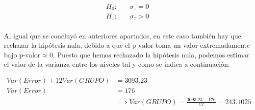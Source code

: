 \documentclass{article}
\begin{document}
      \begin{align*}
        H_0:&\quad \sigma_\tau = 0 \\
        H_1:&\quad \sigma_\tau > 0
      \end{align*}

      \paragraph{}
      Al igual que se concluyó en anteriores apartados, en este caso también hay que rechazar la hipótesis nula, debido a que el $\text{p-valor}$ toma un valor extremadamente bajo $\text{p-valor}\approx 0$. Puesto que hemos rechazado la hipótesis nula, podemos estimar el valor de la varianza entre los niveles tal y como se indica a continuación:

      \begin{align*}
        Var(Error) + 12 Var(GRUPO) &= 3093.23\\
        Var(Error) &= 176 \\
        &\implies Var(GRUPO) = \frac{3093.23 - 176}{12} = 243.1025
      \end{align*}
\end{document}

